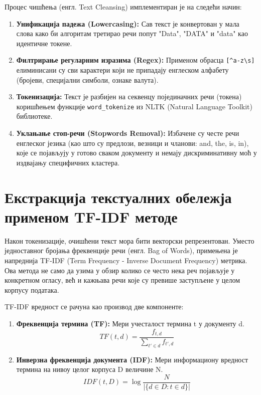 \documentclass[a4paper,12pt]{report}
\begin{document}
	Процес чишћења (енгл. Text Cleansing) имплементиран је на следећи начин:
	
	\begin{enumerate}
	
	\item \textbf{Унификација падежа (Lowercasing):} Сав текст је конвертован у мала слова како би алгоритам третирао речи попут "Data", "DATA" и "data" као идентичне токене.
	
	\item \textbf{Филтрирање регуларним изразима (Regex):} Применом обрасца \verb|[^a-z\s]| елиминисани су сви карактери који не припадају енглеском алфабету (бројеви, специјални симболи, ознаке валута).
	
	\item \textbf{Токенизација:} Текст је разбијен на секвенцу појединачних речи (токена) коришћењем функције \verb|word_tokenize| из NLTK (Natural Language Toolkit) библиотеке.
	
	\item \textbf{Уклањање стоп-речи (Stopwords Removal):} Избачене су честе речи енглеског језика (као што су предлози, везници и чланови: and, the, is, in), које се појављују у готово сваком документу и немају дискриминативну моћ у издвајању специфичних кластера.
	
	\end{enumerate}

	\section{Екстракција текстуалних обележја применом TF-IDF методе}
	Након токенизације, очишћени текст мора бити векторски репрезентован. Уместо једноставног бројања фреквенције речи (енгл. Bag of Words), примењена је напреднија TF-IDF (Term Frequency - Inverse Document Frequency) метрика. Ова метода не само да узима у обзир колико се често нека реч појављује у конкретном огласу, већ и кажњава речи које су превише заступљене у целом корпусу података.
	
	TF-IDF вредност се рачуна као производ две компоненте:
	
	\begin{enumerate}
	
	\item \textbf{Фреквенција термина (TF):} Мери учесталост термина t у документу d. 
	$$ TF(t, d) = \frac{f_{t,d}}{\sum_{t' \in d} f_{t',d}} $$
	
	\item \textbf{Инверзна фреквенција документа (IDF):} Мери информациону вредност термина на нивоу целог корпуса D величине N.
	$$ IDF(t, D) = \log \frac{N}{|\{d \in D : t \in d\}|} $$
	
	\end{enumerate}
\end{document}
